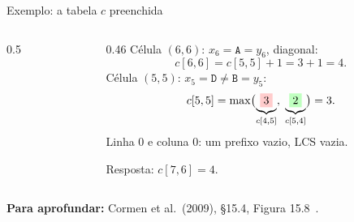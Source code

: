 \documentclass[aspectratio=169,xcolor=table]{beamer}
\newcommand{\gradePD}[3]{%
  \foreach \y [count=\j from 1] in #2
    \node[font=\tiny\ttfamily\bfseries, gray!60!black] at ({\j*0.55},0.36) {\y};
  \foreach \x [count=\i from 1] in #1
    \node[font=\tiny\ttfamily\bfseries, gray!60!black] at (-0.45,{-\i*0.36}) {\x};
  \foreach \lin [count=\i from 0] in #3
    \foreach \v [count=\j from 0] in \lin
      \node[cel] at ({\j*0.55},{-\i*0.36}) {\v};%
}
\newcommand{\marca}[3]{\fill[#3] ({#2*0.55-0.275},{-#1*0.36-0.18}) rectangle +(0.55,0.36);}
\newcommand{\rotX}{A,B,C,B,D,A,B}
\newcommand{\rotY}{B,D,C,A,B,A}
\newcommand{\valoresC}{{0,0,0,0,0,0,0},{0,0,0,0,1,1,1},{0,1,1,1,1,2,2},{0,1,1,2,2,2,2},%
  {0,1,1,2,2,3,3},{0,1,2,2,2,3,3},{0,1,2,2,3,3,4},{0,1,2,2,3,4,4}}
\newcommand{\fonte}[1]{%
  \vfill
  {\tiny\color{gray!55!black}\textbf{Para aprofundar:} #1\par}%
}
\begin{document}
\begin{frame}{Exemplo: a tabela $c$ preenchida}
  \begin{columns}[c]
    \begin{column}{0.5\textwidth}
      \centering
    \end{column}
    \begin{column}{0.46\textwidth}
      \scriptsize Célula \colorbox{orange!40}{$(6,6)$}: $x_6 = \texttt{A} = y_6$, diagonal:
      \[ c[6,6] = c[5,5] + 1 = 3 + 1 = 4. \]
      Célula \colorbox{orange!40}{$(5,5)$}: $x_5 = \texttt{D} \ne \texttt{B} = y_5$:
      \[ c[5,5] = \max\bigl(\underbrace{\colorbox{red!20}{$3$}}_{c[4,5]},\;
         \underbrace{\colorbox{green!25}{$2$}}_{c[5,4]}\bigr) = 3. \]
      Linha 0 e coluna 0: um prefixo vazio, LCS vazia.
      \medskip

      Resposta: $c[7,6] = 4$.
    \end{column}
  \end{columns}
  \fonte{Cormen et al.\ (2009), \S 15.4, Figura 15.8~\cite{cormen2009introduction}.}
\end{frame}
\end{document}
